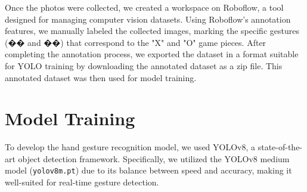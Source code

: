 \documentclass[a4paper,12pt]{article}
\begin{document}
Once the photos were collected, we created a workspace on Roboflow, a tool designed for managing computer vision datasets. Using Roboflow’s annotation features, we manually labeled the collected images, marking the specific gestures (�� and ��) that correspond to the "X" and "O" game pieces. After completing the annotation process, we exported the dataset in a format suitable for YOLO training by downloading the annotated dataset as a zip file. This annotated dataset was then used for model training.

\section{Model Training}
To develop the hand gesture recognition model, we used YOLOv8, a state-of-the-art object detection framework. Specifically, we utilized the YOLOv8 medium model (\texttt{yolov8m.pt}) due to its balance between speed and accuracy, making it well-suited for real-time gesture detection.
\end{document}

